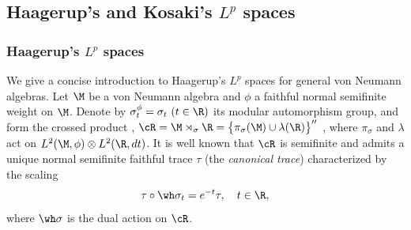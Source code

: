 \documentclass[sn-mathphys-num]{sn-jnl}
\begin{document}
\subsection{Haagerup's and Kosaki's \texorpdfstring{$L^p$}{Lp} spaces}\label{sec:lp-spaces}
\subsubsection{Haagerup's \texorpdfstring{$L^p$}{Lp} spaces}\label{sec:H-Lp}
We give a concise introduction to Haagerup's $L^p$ spaces \cite[Section~1.2]{haagerup2009reductionmethodnoncommutativelpspaces}\cite{haagerup1979lpspaces} for general von Neumann algebras.
Let $\M$ be a von Neumann algebra and $\phi$ a faithful normal semifinite weight on $\M$.  Denote by $ \sigma_t^\phi=\sigma_t\ (t\in\R)$
its modular automorphism group, and form the crossed product \cite[Section~X]{takesaki_theory_2003-2},
$
  \cR=\M\rtimes_{\sigma}\R
   = \bigl\{\pi_\sigma(\M)\cup\lambda(\R)\bigr\}''
$
, where $\pi_\sigma$ and $\lambda$ act on $L^2(\M,\phi)\otimes L^2(\R,dt)$.
It is well known that $\cR$ is semifinite and admits a unique normal semifinite faithful trace $\tau$ (the \emph{canonical trace}) characterized by the scaling
\begin{equation}\label{eq:canonical-trace}
  \tau\circ\wh\sigma_t = e^{-t} \tau,
  \quad t\in\R,
\end{equation}
where $\wh\sigma$ is the dual action on $\cR$.
\end{document}
